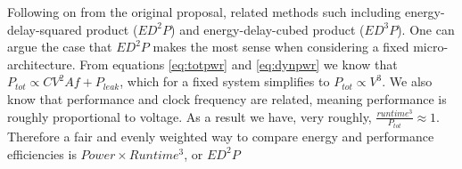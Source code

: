 Following on from the original proposal, related methods such including energy-delay-squared product ($ED^{2}P$) and energy-delay-cubed product ($ED^{3}P$). One can argue the case that $ED^{2}P$ makes the most sense when considering a fixed micro-architecture. From equations \ref{eq:totpwr} and \ref{eq:dynpwr} we know that $P_{tot} \propto CV^{2}Af + P_{leak} $, which for a fixed system simplifies to $P_{tot} \propto V^{3}$. We also know that performance and clock frequency are related, meaning performance is roughly proportional to voltage. As a result we have, very roughly, $\frac{runtime^{3}}{P_{tot}} \approx 1$. Therefore a fair and evenly weighted way to compare energy and performance efficiencies is $Power \times Runtime^{3}$, or $ED^{2}P$ \cite{brooks:2000aa}